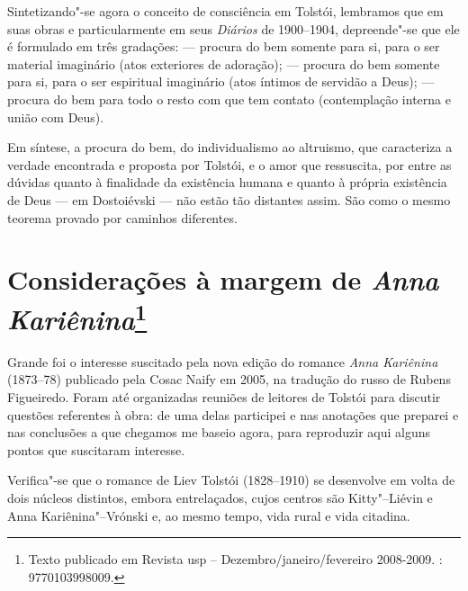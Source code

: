 Sintetizando"-se agora o conceito de consciência em Tolstói, lembramos que em suas
obras e particularmente em seus \emph{Diários} de 1900--1904,
depreende"-se que ele é formulado em três gradações:  --- procura do bem
somente para si, para o ser material imaginário (atos exteriores de
adoração);  --- procura do bem somente para si, para o ser espiritual
imaginário (atos íntimos de servidão a Deus);  --- procura do bem
para todo o resto com que tem contato (contemplação interna e união com Deus).

Em síntese, a procura do bem, do individualismo ao altruismo, que
caracteriza a verdade encontrada e proposta por Tolstói, e o amor que
ressuscita, por entre as dúvidas quanto à finalidade da existência
humana e quanto à própria existência de Deus --- em Dostoiévski --- não estão
tão distantes assim. São como o mesmo teorema provado por caminhos
diferentes.

\chapter{Considerações à margem de \emph{Anna Kariênina}\footnote{Texto
  publicado em Revista usp -- Dezembro/janeiro/fevereiro 2008-2009. :
  9770103998009.}}

Grande foi o interesse suscitado pela nova edição do romance \emph{Anna
Kariênina} (1873--78) publicado pela Cosac Naify em 2005, na tradução do russo de Rubens Figueiredo. Foram até organizadas
reuniões de leitores de Tolstói para discutir questões referentes à
obra: de uma delas participei e nas anotações que preparei e nas
conclusões a que chegamos me baseio agora, para reproduzir aqui alguns
pontos que suscitaram interesse.

Verifica"-se que o romance de Liev Tolstói (1828--1910) se desenvolve em
volta de dois núcleos distintos, embora entrelaçados, cujos centros
são Kitty"--Liévin e Anna Kariênina"--Vrónski e, ao mesmo tempo, vida
rural e vida citadina.

